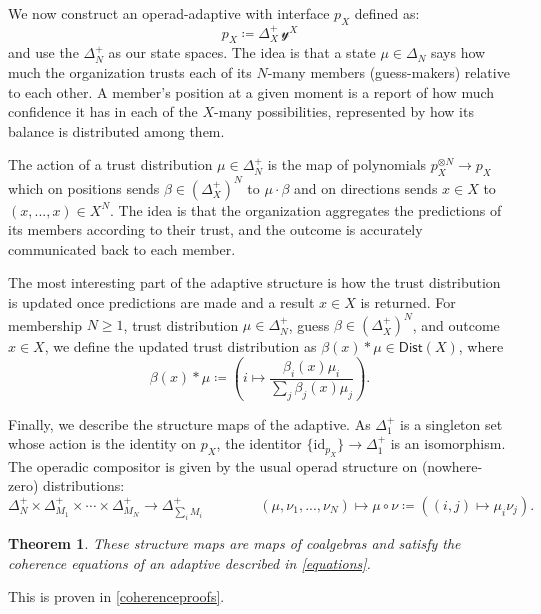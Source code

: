 \documentclass[11pt, one side, article]{memoir}
\theoremstyle{definition}
\theoremstyle{plain}
\newtheorem{theorem}[definitionx]{Theorem}
\newcommand{\Set}[1]{\mathsf{#1}}%
\newcommand{\id}{\mathrm{id}}
\newcommand{\yon}{\mathcal{y}}
\newcommand{\0}{\textsf{0}}
\newcommand{\1}{\tn{\textsf{1}}}
\newcommand{\dist}{\Set{Dist}}
\newcommand{\bet}{\Delta^+}
\begin{document}
We now construct an operad-adaptive with interface $p_X$ defined as:
\[
p_X\coloneqq \bet_X\,\yon^X
\]
and use the $\Delta^+_N$ as our state spaces. The idea is that a state $\mu\in\Delta_N$ says how much the organization trusts each of its $N$-many members (guess-makers) relative to each other. A member's position at a given moment is a report of how much confidence it has in each of the $X$-many possibilities, represented by how its balance is distributed among them.

The action of a trust distribution $\mu \in \Delta^+_N$ is the map of polynomials $p_X^{\otimes N} \to p_X$ which on positions sends $\beta \in (\bet_X)^N$ to $\mu \cdot \beta$ and on directions sends $x \in X$ to $(x,...,x) \in X^N$. The idea is that the organization aggregates the predictions of its members according to their trust, and the outcome is accurately communicated back to each member.

The most interesting part of the adaptive structure is how the trust distribution is updated once predictions are made and a result $x\in X$ is returned. For membership $N\geq 1$, trust distribution $\mu\in\Delta^+_N$, guess $\beta\in(\bet_X)^N$, and outcome $x\in X$, we define the updated trust distribution as $\beta(x) * \mu \in\dist(X)$, where
\[
\beta(x) * \mu \coloneqq \left( i \mapsto \frac{\beta_i(x)\mu_i}{\sum_j \beta_j(x)\mu_j}\right).
\]

Finally, we describe the structure maps of the adaptive. As $\Delta^+_1$ is a singleton set whose action is the identity on $p_X$, the identitor $\{\id_{p_X}\} \to \Delta^+_1$ is an isomorphism. The operadic compositor is given by the usual operad structure on (nowhere-zero) distributions:
\[
\Delta^+_N \times \Delta^+_{M_1} \times \cdots \times \Delta^+_{M_N} \to \Delta^+_{\sum_i M_i} \qquad\qquad (\mu,\nu_1,...,\nu_N) \mapsto \mu \circ \nu \coloneqq \left( (i,j) \mapsto \mu_i\nu_j \right).
\]

\begin{theorem}\label{predictionadaptive}%
These structure maps are maps of coalgebras and satisfy the coherence equations of an adaptive described in \cref{equations}.
\end{theorem}

This is proven in \cref{coherenceproofs}.
\end{document}
